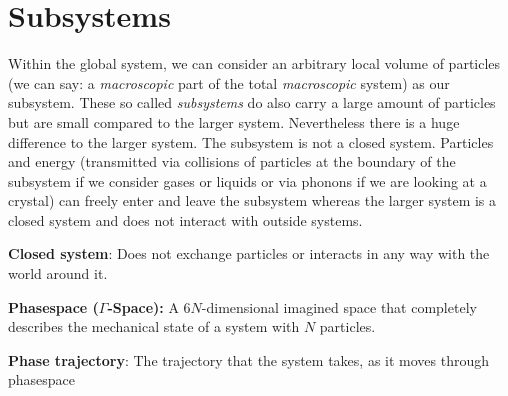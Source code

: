 \section{Subsystems}
Within the global system, we can consider an arbitrary local volume of particles (we can say: a \textit{macroscopic} part of the total \textit{macroscopic} system) as our subsystem. These so called \textit{subsystems} do also carry a large amount of particles but are small compared to the larger system. Nevertheless there is a huge difference to the larger system. The subsystem is not a closed system. Particles and energy (transmitted via collisions of particles at the boundary of the subsystem if we consider gases or liquids or via phonons if we are looking at a crystal) can freely enter and leave the subsystem whereas the larger system is a closed system and does not interact with outside systems. 

\begin{summarybox}
	\textbf{Closed system}: Does not exchange particles or interacts in any way with the world around it.
	
	\textbf{Phasespace ($\Gamma$-Space):} A $6N$-dimensional imagined space that completely describes the mechanical state of a system with $N$ particles.
	
	\textbf{Phase trajectory}: The trajectory that the system takes, as it moves through phasespace
\end{summarybox}